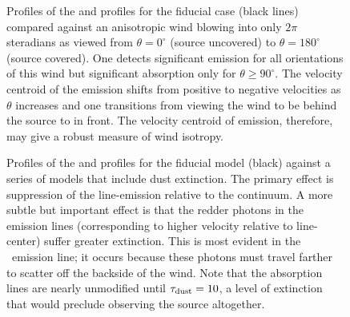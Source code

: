 \documentclass[12pt,preprint]{aastex}
\begin{document}
\begin{figure}
\caption{
Profiles of the  and  profiles for the fiducial
case (black lines) compared against an anisotropic wind blowing into
only $2\pi$ steradians as viewed from $\theta = 0^\circ$ (source
uncovered) to $\theta = 180^\circ$ (source covered).  One detects
significant emission for all orientations of this wind but significant
absorption only for $\theta \ge 90^\circ$.
The velocity centroid of the 
emission shifts from positive to negative velocities as $\theta$
increases and one transitions from viewing the wind to be behind the
source to in front.  The velocity centroid of emission, therefore, may
give a robust measure of wind isotropy.
}
\label{fig:anisotropic}
\end{figure}

\begin{figure}
\caption{
Profiles of the  and  profiles for the fiducial
model (black) against a series of models that include 
dust extinction.  The primary effect is suppression of
the line-emission relative to the continuum. 
A more subtle but important effect is that the redder photons in the
emission lines (corresponding to higher velocity relative to
line-center) suffer greater extinction.  This is most evident in the
\feiic\ emission line; it occurs because these photons must
travel farther to scatter off the backside of the wind.  Note that
the absorption lines are nearly unmodified until $\tau_{\rm dust} = 10$, a
level of extinction that would preclude observing the source
altogether.
}
\label{fig:dust}
\end{figure}

\end{document}
